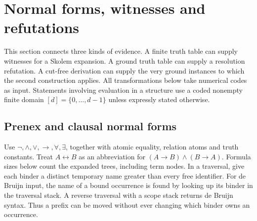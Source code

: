 \section{Normal forms, witnesses and refutations}
\label{sec:normal}

This section connects three kinds of evidence. A finite truth table can supply witnesses for a Skolem expansion. A ground truth table can supply a resolution refutation. A cut-free derivation can supply the very ground instances to which the second construction applies. All transformations below take numerical codes as input. Statements involving evaluation in a structure use a coded nonempty finite domain $[d]=\{0,\ldots,d-1\}$ unless expressly stated otherwise.

\subsection{Prenex and clausal normal forms}

Use $\neg,\wedge,\vee,\to,\forall,\exists$, together with atomic equality, relation atoms and truth constants. Treat $A\leftrightarrow B$ as an abbreviation for $(A\to B)\wedge(B\to A)$. Formula sizes below count the expanded trees, including term nodes. In a traversal, give each binder a distinct temporary name greater than every free identifier. For de Bruijn input, the name of a bound occurrence is found by looking up its binder in the traversal stack. A reverse traversal with a scope stack returns de Bruijn syntax. Thus a prefix can be moved without ever changing which binder owns an occurrence.

